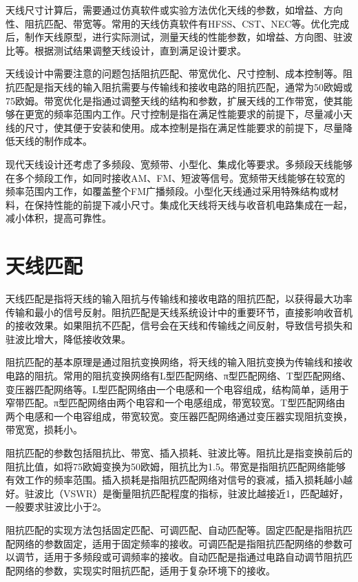 \documentclass[12pt,UTF8]{ctexbook}
\begin{document}
天线尺寸计算后，需要通过仿真软件或实验方法优化天线的参数，如增益、方向性、阻抗匹配、带宽等。常用的天线仿真软件有HFSS、CST、NEC等。优化完成后，制作天线原型，进行实际测试，测量天线的性能参数，如增益、方向图、驻波比等。根据测试结果调整天线设计，直到满足设计要求。

天线设计中需要注意的问题包括阻抗匹配、带宽优化、尺寸控制、成本控制等。阻抗匹配是指天线的输入阻抗需要与传输线和接收电路的阻抗匹配，通常为50欧姆或75欧姆。带宽优化是指通过调整天线的结构和参数，扩展天线的工作带宽，使其能够在更宽的频率范围内工作。尺寸控制是指在满足性能要求的前提下，尽量减小天线的尺寸，使其便于安装和使用。成本控制是指在满足性能要求的前提下，尽量降低天线的制作成本。

现代天线设计还考虑了多频段、宽频带、小型化、集成化等要求。多频段天线能够在多个频段工作，如同时接收AM、FM、短波等信号。宽频带天线能够在较宽的频率范围内工作，如覆盖整个FM广播频段。小型化天线通过采用特殊结构或材料，在保持性能的前提下减小尺寸。集成化天线将天线与收音机电路集成在一起，减小体积，提高可靠性。

\section{天线匹配}

天线匹配是指将天线的输入阻抗与传输线和接收电路的阻抗匹配，以获得最大功率传输和最小的信号反射。阻抗匹配是天线系统设计中的重要环节，直接影响收音机的接收效果。如果阻抗不匹配，信号会在天线和传输线之间反射，导致信号损失和驻波比增大，降低接收效果。

阻抗匹配的基本原理是通过阻抗变换网络，将天线的输入阻抗变换为传输线和接收电路的阻抗。常用的阻抗变换网络有L型匹配网络、π型匹配网络、T型匹配网络、变压器匹配网络等。L型匹配网络由一个电感和一个电容组成，结构简单，适用于窄带匹配。π型匹配网络由两个电容和一个电感组成，带宽较宽。T型匹配网络由两个电感和一个电容组成，带宽较宽。变压器匹配网络通过变压器实现阻抗变换，带宽宽，损耗小。

阻抗匹配的参数包括阻抗比、带宽、插入损耗、驻波比等。阻抗比是指变换前后的阻抗比值，如将75欧姆变换为50欧姆，阻抗比为1.5。带宽是指阻抗匹配网络能够有效工作的频率范围。插入损耗是指阻抗匹配网络对信号的衰减，插入损耗越小越好。驻波比（VSWR）是衡量阻抗匹配程度的指标，驻波比越接近1，匹配越好，一般要求驻波比小于2。

阻抗匹配的实现方法包括固定匹配、可调匹配、自动匹配等。固定匹配是指阻抗匹配网络的参数固定，适用于固定频率的接收。可调匹配是指阻抗匹配网络的参数可以调节，适用于多频段或可调频率的接收。自动匹配是指通过电路自动调节阻抗匹配网络的参数，实现实时阻抗匹配，适用于复杂环境下的接收。
\end{document}
